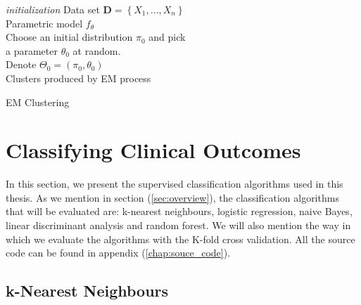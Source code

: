 \documentclass[../thesis.tex]{subfiles}
\begin{document}
\begin{algorithm}[H]{
\SetAlgoLined
\textit{initialization}\;
    \hspace*{0,5cm}Data set $\mathbf{D} = \left \{X_1, \hdots, X_n \right\}$\\
    \hspace*{0,5cm}Parametric model $f_\theta$\\
    \hspace*{0,5cm}Choose an initial distribution $\pi_0$ and pick\\ \hspace*{0,5cm}a parameter $\theta_0$ at random.\\
    \hspace*{0,5cm}Denote $\Theta_0 = (\pi_0, \theta_0)$\\
    \Return Clusters produced by EM process
}
\caption{EM Clustering}
\end{algorithm}

\section{Classifying Clinical Outcomes}
\label{sec:classify_clin_out}

\noindent In this section, we present the supervised classification algorithms used in this thesis. As we mention in section (\ref{sec:overview}), the classification algorithms that will be evaluated are: k-nearest neighbours, logistic regression, naive Bayes, linear discriminant analysis and random forest. We will also mention the way in which we evaluate the algorithms with the K-fold cross validation. All the source code can be found in appendix (\ref{chap:souce_code}).

\subsection{k-Nearest Neighbours}
\label{subsec:knn}
\end{document}
